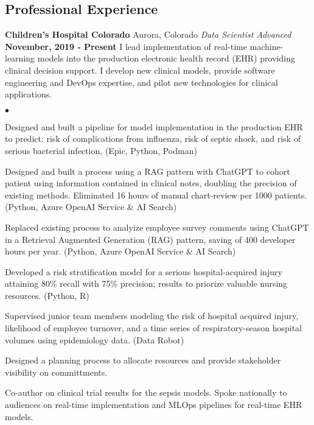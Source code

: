 \documentclass[margin,line, 11pt]{res}
\newenvironment{list2}{
  \begin{list}{$\bullet$}{%
      \setlength{\itemsep}{0in}
      \setlength{\parsep}{0in} \setlength{\parskip}{0in}
      \setlength{\topsep}{0in} \setlength{\partopsep}{0in}
      \setlength{\leftmargin}{0.2in}}}{\end{list}}
\begin{document}
\begin{resume}
\section{Professional \newline Experience}
\textbf{Children's Hospital Colorado} \hfill Aurora, Colorado\newline
\textit{Data Scientist Advanced} \hfill \textbf{November, 2019 - Present}\newline
I lead implementation of real-time machine-learning models into the production electronic health record (EHR) providing clinical decision support. I develop new clinical models, provide software engineering and DevOps expertise, and pilot new technologies for clinical applications.
    \begin{list2}
      \item Designed and built a pipeline for model implementation in the production EHR to predict: risk of complications from influenza, risk of septic shock, and risk of serious bacterial infection, (Epic, Python, Podman)
      \item Designed and built a process using a RAG pattern with ChatGPT to cohort patient using information contained in clinical notes, doubling the precision of existing methods. Eliminated 16 hours of manual chart-review per 1000 patients. (Python, Azure OpenAI Service \& AI Search)
      \item Replaced existing process to analyize employee survey comments using ChatGPT in a Retrieval Augmented Generation (RAG) pattern, saving of 400 developer hours per year. (Python, Azure OpenAI Service \& AI Search)
      \item Developed a risk stratification model for a serious hospital-acquired injury attaining 80\% recall with 75\% precision; results to priorize valuable nursing resources. (Python, R)
      \item Supervised junior team members modeling the risk of hospital acquired injury, likelihood of employee turnover, and a time series of respiratory-season hospital volumes using epidemiology data. (Data Robot)
      \item Designed a planning process to allocate resources and provide stakeholder visibility on committments.
      \item Co-author on clinical trial results for the sepsis models. Spoke nationally to audiences on real-time implementation and MLOps pipelines for real-time EHR models.
    \end{list2}
\vspace*{-2mm}


\end{resume}
\end{document}
